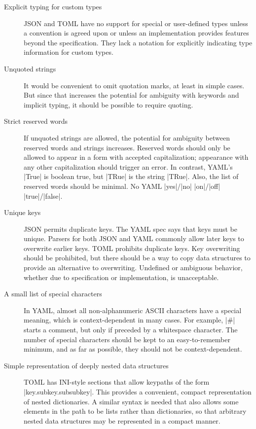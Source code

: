 \documentclass[11pt]{article}
\begin{document}
\begin{description}
\item[Explicit typing for custom types]  JSON and TOML have no support for special or user-defined types unless a convention is agreed upon or unless an implementation provides features beyond the specification.  They lack a notation for explicitly indicating type information for custom types.

\item[Unquoted strings]  It would be convenient to omit quotation marks, at least in simple cases.  But since that increases the potential for ambiguity with keywords and implicit typing, it should be possible to require quoting.

\item[Strict reserved words]  If unquoted strings are allowed, the potential for ambiguity between reserved words and strings increases.  Reserved words should only be allowed to appear in a form with accepted capitalization; appearance with any other capitalization should trigger an error.  In contrast, YAML's |True| is boolean true, but |TRue| is the string |TRue|.  Also, the list of reserved words should be minimal.  No YAML |yes|/|no| |on|/|off| |true|/|false|.

\item[Unique keys] JSON permits duplicate keys.  The YAML spec says that keys must be unique.  Parsers for both JSON and YAML commonly allow later keys to overwrite earlier keys.  TOML prohibits duplicate keys.  Key overwriting should be prohibited, but there should be a way to copy data structures to provide an alternative to overwriting.  Undefined or ambiguous behavior, whether due to specification or implementation, is unacceptable.

\item[A small list of special characters] In YAML, almost all non-alphanumeric ASCII characters have a special meaning, which is context-dependent in many cases.  For example, |#| starts a comment, but only if preceded by a whitespace character.  The number of special characters should be kept to an easy-to-remember minimum, and as far as possible, they should not be context-dependent.  

\item[Simple representation of deeply nested data structures]  TOML has INI-style sections that allow keypaths of the form |key.subkey.subsubkey|.  This provides a convenient, compact representation of nested dictionaries.  A similar syntax is needed that also allows some elements in the path to be lists rather than dictionaries, so that arbitrary nested data structures may be represented in a compact manner.


\end{description}
\end{document}
